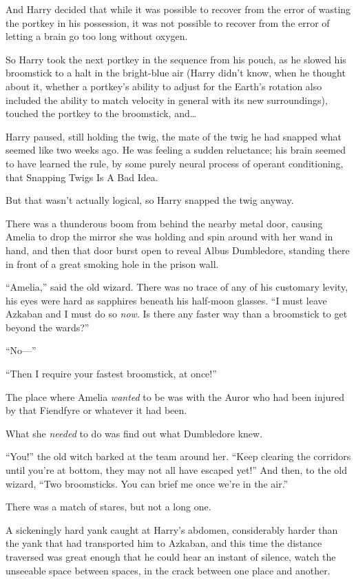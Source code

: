 And Harry decided that while it was possible to recover from the error of wasting the portkey in his possession, it was not possible to recover from the error of letting a brain go too long without oxygen.

So Harry took the next portkey in the sequence from his pouch, as he slowed his broomstick to a halt in the bright-blue air (Harry didn’t know, when he thought about it, whether a portkey’s ability to adjust for the Earth’s rotation also included the ability to match velocity in general with its new surroundings), touched the portkey to the broomstick, and…

Harry paused, still holding the twig, the mate of the twig he had snapped what seemed like two weeks ago. He was feeling a sudden reluctance; his brain seemed to have learned the rule, by some purely neural process of operant conditioning, that Snapping Twigs Is A Bad Idea.

But that wasn’t actually logical, so Harry snapped the twig anyway.

\later

There was a thunderous boom from behind the nearby metal door, causing Amelia to drop the mirror she was holding and spin around with her wand in hand, and then that door burst open to reveal Albus Dumbledore, standing there in front of a great smoking hole in the prison wall.

“Amelia,” said the old wizard. There was no trace of any of his customary levity, his eyes were hard as sapphires beneath his half-moon glasses. “I must leave Azkaban and I must do so \emph{now}. Is there any faster way than a broomstick to get beyond the wards?”

“No—”

“Then I require your fastest broomstick, at once!”

The place where Amelia \emph{wanted} to be was with the Auror who had been injured by that Fiendfyre or whatever it had been.

What she \emph{needed} to do was find out what Dumbledore knew.

“You!” the old witch barked at the team around her. “Keep clearing the corridors until you’re at bottom, they may not all have escaped yet!” And then, to the old wizard, “Two broomsticks. You can brief me once we’re in the air.”

There was a match of stares, but not a long one.

\later

A sickeningly hard yank caught at Harry’s abdomen, considerably harder than the yank that had transported him to Azkaban, and this time the distance traversed was great enough that he could hear an instant of silence, watch the unseeable space between spaces, in the crack between one place and another.

